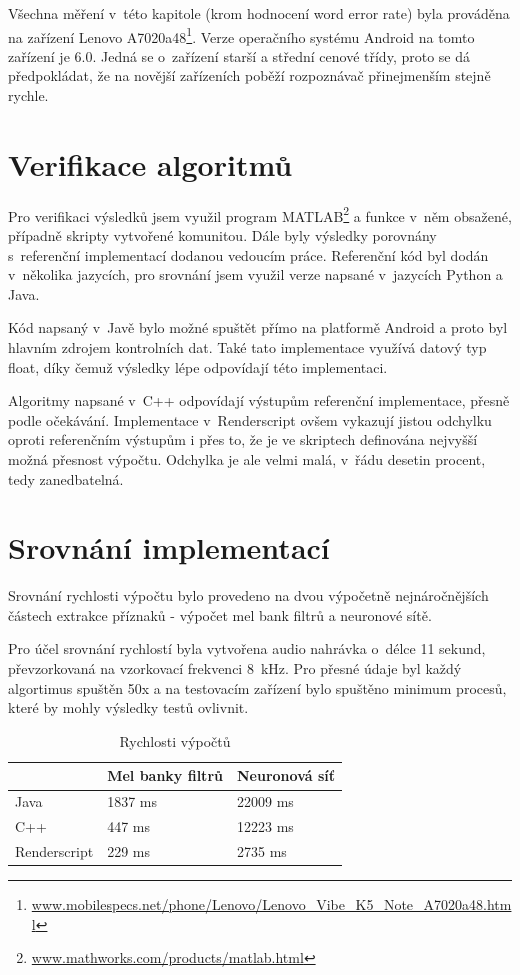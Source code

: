 Všechna měření v~této kapitole (krom hodnocení word error rate) byla prováděna na zařízení Lenovo A7020a48\footnote{\url{www.mobilespecs.net/phone/Lenovo/Lenovo_Vibe_K5_Note_A7020a48.html}}. Verze operačního systému Android na tomto zařízení je 6.0. Jedná se o~zařízení starší a střední cenové třídy, proto se dá předpokládat, že na novější zařízeních poběží rozpoznávač přinejmenším stejně rychle.

\section{Verifikace algoritmů}
Pro verifikaci výsledků jsem využil program MATLAB\footnote{\url{www.mathworks.com/products/matlab.html}} a funkce v~něm obsažené, případně skripty vytvořené komunitou. Dále byly výsledky porovnány s~referenční implementací dodanou vedoucím práce. Referenční kód byl dodán v~několika jazycích, pro srovnání jsem využil verze napsané v~jazycích Python a Java. 

Kód napsaný v~Javě bylo možné spuštět přímo na platformě Android a proto byl hlavním zdrojem kontrolních dat. Také tato implementace využívá datový typ float, díky čemuž výsledky lépe odpovídají této implementaci.

Algoritmy napsané v~C++ odpovídají výstupům referenční implementace, přesně podle očekávání. Implementace v~Renderscript ovšem vykazují jistou odchylku oproti referenčním výstupům i přes to, že je ve skriptech definována nejvyšší možná přesnost výpočtu. Odchylka je ale velmi malá, v~řádu desetin procent, tedy zanedbatelná. 

\section{Srovnání implementací}
\label{sec:comparison}
Srovnání rychlosti výpočtu bylo provedeno na dvou výpočetně nejnáročnějších částech extrakce příznaků - výpočet mel bank filtrů a neuronové sítě.

Pro účel srovnání rychlostí byla vytvořena audio nahrávka o~délce 11 sekund, převzorkovaná na vzorkovací frekvenci 8~kHz. Pro přesné údaje byl každý algortimus spuštěn 50x a na testovacím zařízení bylo spuštěno minimum procesů, které by mohly výsledky testů ovlivnit.

\begin{table}[H]
\centering
\caption{Rychlosti výpočtů}
\label{tab:speed_comp}
\begin{tabular}{|l|l|l|}
\hline
             & Mel banky filtrů & Neuronová síť \\ \hline
Java         & 1837 ms         & 22009 ms      \\ \hline
C++          & 447 ms          & 12223 ms      \\ \hline
Renderscript & 229 ms          & 2735 ms       \\ \hline
\end{tabular}
\end{table}

